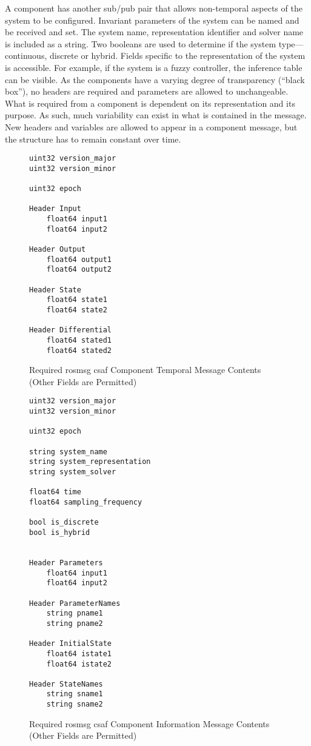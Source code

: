 A component has another sub/pub pair that allows non-temporal aspects of the system to be configured. 
Invariant parameters of the system can be named and be received and set. The system name, representation 
identifier and solver name is included as a string. Two booleans are used to determine if the 
system type---continuous, discrete or hybrid.  Fields specific to the representation of the system is 
accessible. For example, if the system is a fuzzy controller, the inference table can be visible. As the 
components have a varying degree of transparency (``black box''), no headers are required and parameters 
are allowed to unchangeable. \\

What is required from a component is dependent on its representation and its purpose. As such, much 
variability can exist in what is contained in the message. New headers and variables are allowed to appear in a 
component message, but the structure has to remain constant over time. \\

\begin{figure}
\begin{lstlisting}
uint32 version_major
uint32 version_minor

uint32 epoch

Header Input
	float64 input1
	float64 input2
	
Header Output
	float64 output1
	float64 output2
	
Header State
	float64 state1
	float64 state2
	
Header Differential
	float64 stated1
	float64 stated2
\end{lstlisting}
\caption{Required \acrshort{ros}msg \acrshort{csaf}  Component Temporal Message Contents (Other Fields are Permitted)}
\label{fig:cmsg}
\end{figure}

\begin{figure}
\begin{lstlisting}
uint32 version_major
uint32 version_minor

uint32 epoch

string system_name
string system_representation
string system_solver

float64 time
float64 sampling_frequency

bool is_discrete
bool is_hybrid


Header Parameters
	float64 input1
	float64 input2
	
Header ParameterNames
	string pname1
	string pname2
	
Header InitialState
	float64 istate1
	float64 istate2
	
Header StateNames
	string sname1
	string sname2
\end{lstlisting}
\caption{Required \acrshort{ros}msg \acrshort{csaf}  Component Information Message Contents (Other Fields are Permitted)}
\label{fig:cmsg}
\end{figure}


